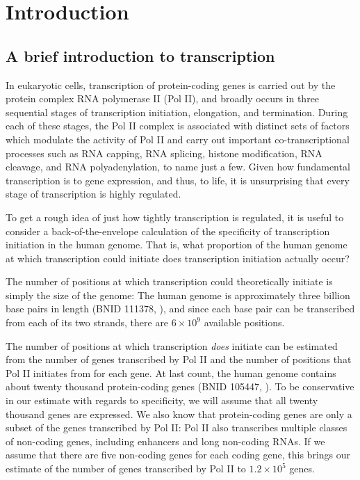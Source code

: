 \chapter{Introduction}

\section{A brief introduction to transcription}

In eukaryotic cells, transcription of protein-coding genes is carried out by the protein complex RNA polymerase II (Pol II), and broadly occurs in three sequential stages of transcription initiation, elongation, and termination.
During each of these stages, the Pol II complex is associated with distinct sets of factors which modulate the activity of Pol II and carry out important co-transcriptional processes such as RNA capping, RNA splicing, histone modification, RNA cleavage, and RNA polyadenylation, to name just a few.
Given how fundamental transcription is to gene expression, and thus, to life, it is unsurprising that every stage of transcription is highly regulated.

To get a rough idea of just how tightly transcription is regulated, it is useful to consider a back-of-the-envelope calculation of the specificity of transcription initiation in the human genome.
That is, what proportion of the human genome at which transcription could initiate does transcription initiation actually occur?

The number of positions at which transcription could theoretically initiate is simply the size of the genome: The human genome is approximately three billion base pairs in length (BNID 111378, \citet{griffin2009}), and since each base pair can be transcribed from each of its two strands, there are $6 \times 10^9$ available positions.

The number of positions at which transcription \textit{does} initiate can be estimated from the number of genes transcribed by Pol II and the number of positions that Pol II initiates from for each gene.
At last count, the human genome contains about twenty thousand protein-coding genes (BNID 105447, \citet{griffin2009}).
To be conservative in our estimate with regards to specificity, we will assume that all twenty thousand genes are expressed.
We also know that protein-coding genes are only a subset of the genes transcribed by Pol II: Pol II also transcribes multiple classes of non-coding genes, including enhancers and long non-coding RNAs.
If we assume that there are five non-coding genes for each coding gene, this brings our estimate of the number of genes transcribed by Pol II to $1.2 \times 10^5$ genes.

